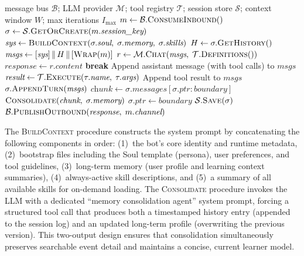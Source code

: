 \begin{algorithm}[ht!]
\caption{TutorBot Autonomous Agent Loop}\label{alg:tutorbot}
\small
\begin{algorithmic}[1]
\Require message bus $\mathcal{B}$;\; LLM provider $\mathcal{M}$;\; tool registry $\mathcal{T}$;\; session store $\mathcal{S}$;\; context window $W$;\; max iterations $I_{\max}$
\Statex
\Loop {}
    \State $m \gets \mathcal{B}.\textsc{ConsumeInbound}()$ 
    \State $\sigma \gets \mathcal{S}.\textsc{GetOrCreate}(m.\textit{session\_key})$
    \Statex
    \State $\textit{sys} \gets \textsc{BuildContext}(\sigma.\textit{soul},\; \sigma.\textit{memory},\; \sigma.\textit{skills})$
    \State $H \gets \sigma.\textsc{GetHistory}()$ 
    \State $\textit{msgs} \gets [\textit{sys}] \,\|\, H \,\|\, [\textsc{Wrap}(m)]$
    \Statex
        \State $r \gets \mathcal{M}.\textsc{Chat}(\textit{msgs},\; \mathcal{T}.\textsc{Definitions}())$
            \State $\textit{response} \gets r.\textit{content}$ 
            \State \textbf{break}
        \EndIf
        \State Append assistant message (with tool calls) to $\textit{msgs}$
            \State $\textit{result} \gets \mathcal{T}.\textsc{Execute}(\tau.\textit{name},\; \tau.\textit{args})$
            \State Append tool result to $\textit{msgs}$
        \EndFor
    \EndFor
    \Statex
    \State $\sigma.\textsc{AppendTurn}(\textit{msgs})$
     
        \State $\textit{chunk} \gets \sigma.\textit{messages}[\sigma.\textit{ptr} : \textit{boundary}]$
        \State $\textsc{Consolidate}(\textit{chunk},\; \sigma.\textit{memory})$ 
        \State $\sigma.\textit{ptr} \gets \textit{boundary}$
    \EndIf
    \State $\mathcal{S}.\textsc{Save}(\sigma)$
    \State $\mathcal{B}.\textsc{PublishOutbound}(\textit{response},\; m.\textit{channel})$
\EndLoop
\end{algorithmic}
\end{algorithm}

The \textsc{BuildContext} procedure constructs the system prompt by concatenating the following components in order:
(1)~the bot's core identity and runtime metadata,
(2)~bootstrap files including the Soul template (persona), user preferences, and tool guidelines,
(3)~long-term memory (user profile and learning context summaries),
(4)~always-active skill descriptions, and
(5)~a summary of all available skills for on-demand loading.
The \textsc{Consolidate} procedure invokes the LLM with a dedicated ``memory consolidation agent'' system prompt, forcing a structured tool call that produces both a timestamped history entry (appended to the session log) and an updated long-term profile (overwriting the previous version).
This two-output design ensures that consolidation simultaneously preserves searchable event detail and maintains a concise, current learner model.

